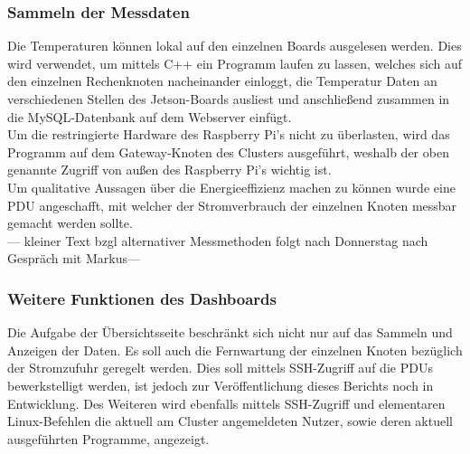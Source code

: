 \subsubsection{Sammeln der Messdaten}
Die Temperaturen können lokal auf den einzelnen Boards ausgelesen werden. Dies wird verwendet, um mittels C++ ein Programm laufen zu lassen, welches sich auf den einzelnen Rechenknoten nacheinander einloggt, die Temperatur Daten an verschiedenen Stellen des Jetson-Boards ausliest und anschließend zusammen in die MySQL-Datenbank auf dem Webserver einfügt.\\
Um die restringierte Hardware des Raspberry Pi's nicht zu überlasten, wird das Programm auf dem Gateway-Knoten des Clusters ausgeführt, weshalb der oben genannte Zugriff von außen des Raspberry Pi's wichtig ist. \\
Um qualitative Aussagen über die Energieeffizienz machen zu können wurde eine PDU angeschafft, mit welcher der Stromverbrauch der einzelnen Knoten messbar gemacht werden sollte. \\
--- kleiner Text bzgl alternativer Messmethoden folgt nach Donnerstag nach Gespräch mit Markus---\\

\subsubsection{Weitere Funktionen des Dashboards}
Die Aufgabe der Übersichtsseite beschränkt sich nicht nur auf das Sammeln und Anzeigen der Daten. Es soll auch die Fernwartung der einzelnen Knoten bezüglich der Stromzufuhr geregelt werden. Dies soll mittels SSH-Zugriff auf die PDUs bewerkstelligt werden, ist jedoch zur Veröffentlichung dieses Berichts noch in Entwicklung.
Des Weiteren wird ebenfalls mittels SSH-Zugriff und elementaren Linux-Befehlen die aktuell am Cluster angemeldeten Nutzer, sowie deren aktuell ausgeführten Programme, angezeigt.
